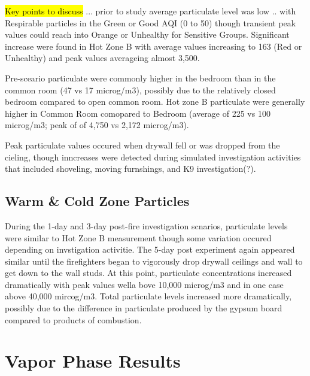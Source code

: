 \documentclass[12pt,oneside]{book}
\begin{document}
\hl{Key points to discuss} ... prior to study average particulate level was low .. with Respirable particles in the Green or Good AQI (0 to 50) though transient peak values could reach into Orange or Unhealthy for Sensitive Groups.  Significant increase were found in Hot Zone B with average values increasing to 163 (Red or Unhealthy) and peak values averageing almost 3,500.

Pre-sceario particulate were commonly higher in the bedroom than in the common room (47 vs 17 microg/m3), possibly due to the relatively closed bedroom compared to open common room.  Hot zone B particulate were generally higher in Common Room comopared to Bedroom (average of 225 vs 100 microg/m3; peak of of 4,750 vs 2,172 microg/m3).

Peak particulate values occured when drywall fell or was dropped from the cieling, though inncreases were detected during simulated investigation activities that included shoveling, moving furnshings, and K9 investigation(?).

\subsection{Warm \& Cold Zone Particles}
\label{subsec:WarmColdparticles}

During the 1-day and 3-day post-fire investigation scnarios, particulate levels were similar to Hot Zone B measurement though some variation occured depending on invstigation activitie.  The 5-day post experiment again appeared similar until the firefighters began to vigorously drop drywall ceilings and wall to get down to the wall studs.  At this point, particulate concentrations increased dramatically with peak values wella bove 10,000 microg/m3 and in one case above 40,000 mircog/m3.  Total particulate levels increased more dramatically, possibly due to the difference in particulate produced by the gypsum board compared to products of combustion.

\section{Vapor Phase Results}
\label{sec:vappr}
\end{document}
